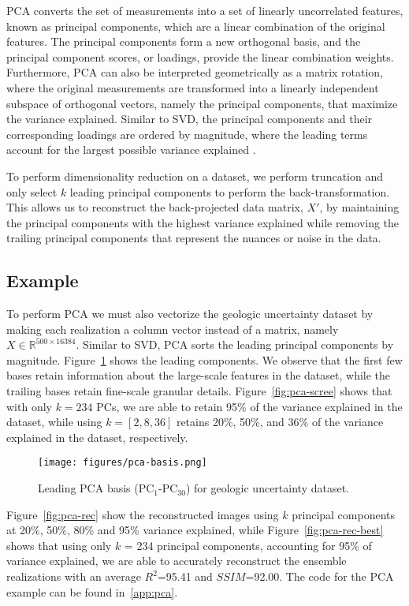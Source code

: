 \documentclass[a4paper,fleqn,12pt]{article}
\begin{document}
PCA converts the set of measurements into a set of linearly uncorrelated features, known as principal components, which are a linear combination of the original features. The principal components form a new orthogonal basis, and the principal component scores, or loadings, provide the linear combination weights. Furthermore, PCA can also be interpreted geometrically as a matrix rotation, where the original measurements are transformed into a linearly independent subspace of orthogonal vectors, namely the principal components, that maximize the variance explained. Similar to SVD, the principal components and their corresponding loadings are ordered by magnitude, where the leading terms account for the largest possible variance explained \cite{esbensen20202}. 

To perform dimensionality reduction on a dataset, we perform truncation and only select $k$ leading principal components to perform the back-transformation. This allows us to reconstruct the back-projected data matrix, $X'$, by maintaining the principal components with the highest variance explained while removing the trailing principal components that represent the nuances or noise in the data.


\subsection*{Example}
To perform PCA we must also vectorize the geologic uncertainty dataset by making each realization a column vector instead of a matrix, namely $X\in\mathbb{R}^{500\times16384}$. Similar to SVD, PCA sorts the leading principal components by magnitude. Figure~\ref{fig:pca-basis} shows the leading components. We observe that the first few bases retain information about the large-scale features in the dataset, while the trailing bases retain fine-scale granular details. Figure~\ref{fig:pca-scree} shows that with only $k=234$ PCs, we are able to retain 95\% of the variance explained in the dataset, while using $k=[2,8,36]$ retains 20\%, 50\%, and 36\% of the variance explained in the dataset, respectively.

\begin{figure}[H]
    \centering
    \texttt{[image: figures/pca-basis.png]}
    \caption{Leading PCA basis (PC$_1$-PC$_{30}$) for geologic uncertainty dataset.}
    \label{fig:pca-basis}
\end{figure}

Figure~\ref{fig:pca-rec} show the reconstructed images using $k$ principal components at 20\%, 50\%, 80\% and 95\% variance explained, while Figure~\ref{fig:pca-rec-best} shows that using only $k$ = 234 principal components, accounting for 95\% of
variance explained, we are able to accurately reconstruct the ensemble realizations with an average $R^2$=95.41 and $SSIM$=92.00. The code for the PCA example can be found in~\ref{app:pca}.
\end{document}
